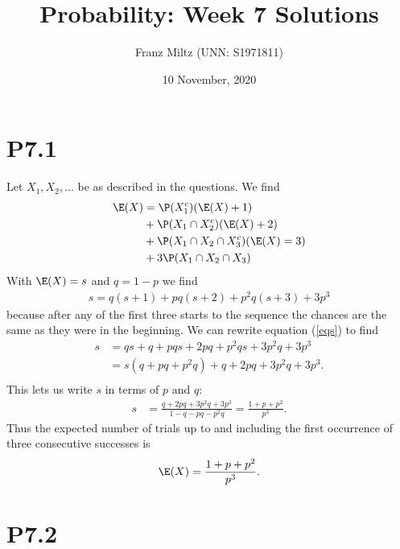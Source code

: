 \documentclass{article}
\begin{document}
\title{Probability: Week 7 Solutions}
\author{Franz Miltz (UNN: S1971811)}
\date{10 November, 2020}
\maketitle


\section*{P7.1}


Let $X_1,X_2,...$ be as described in the questions. We find
\begin{align*}
  \E(X) & = \P(X_1^c)(\E(X)+1)                \\
        & +\P(X_1\cap X_2^c)(\E(X)+2)         \\
        & +\P(X_1\cap X_2\cap X_3^c)(\E(X)=3) \\
        & +3\P(X_1\cap X_2\cap X_3)
\end{align*}
With $\E(X)=s$ and $q=1-p$ we find
\begin{align}
  \label{eqs}
  s = q(s+1) + pq(s+2) + p^2q(s+3) +3p^3
\end{align}
because after any of the first three starts to the sequence the chances
are the same as they were in the beginning.
We can rewrite equation (\ref{eqs}) to find
\begin{align*}
  s & = qs + q + pqs + 2pq + p^2qs + 3p^2q + 3p^3 \\
    & = s(q+pq+p^2q)+q + 2pq + 3p^2q + 3p^3.      \\
\end{align*}
This lets us write $s$ in terms of $p$ and $q$:
\begin{align*}
  s & = \frac{q+2pq+3p^2q+3p^3}{1-q-pq-p^2q} =\frac{1+p+p^2}{p^3}.
\end{align*}
Thus the expected number of trials up to and including the first occurrence of
three consecutive successes is
\begin{align*}
  \E(X) = \frac{1+p+p^2}{p^3}.
\end{align*}


\section*{P7.2}
\end{document}

